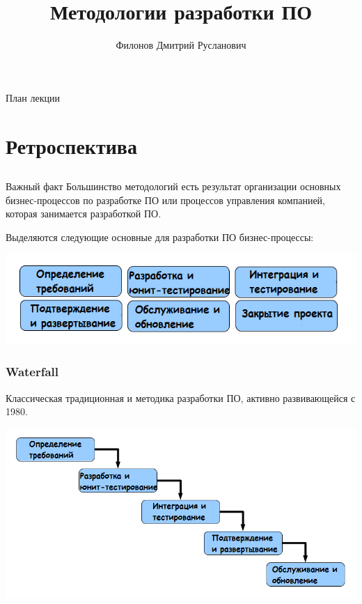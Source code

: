 \documentclass{../industrial-development}
\title{Методологии разработки ПО}
\author{Филонов Дмитрий Русланович}
\date{}
\begin{document}
\begin{frame}
  \titlepage
\end{frame}

\begin{frame}{План лекции}
  \tableofcontents
\end{frame}

\section{Ретроспектива}
\subsection{}

\begin{frame} \frametitle{}
  \begin{block}{Важный факт}
    Большинство методологий есть результат организации \alert{основных} бизнес-процессов по разработке ПО или процессов \alert{управления} компанией, которая занимается разработкой ПО.
  \end{block}
Выделяются следующие \alert{основные} для разработки ПО бизнес-процессы:
\centerline{\includegraphics[width=1.10\textheight]{BP.png}} 
\end{frame}

\begin{frame} \frametitle{Waterfall}
  \begin{block}{}
    Классическая традиционная и методика разработки ПО, активно развивающейся с 1980.
  \end{block}
 \centerline{\includegraphics[height=0.6\textheight]{w1.png}}
\end{frame}
\end{document}
